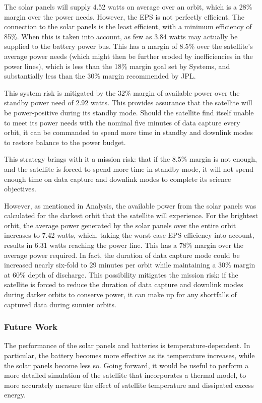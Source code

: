 \documentclass[12pt]{article}
\begin{document}
The solar panels will supply 4.52 watts on average over an orbit, which is a 28\% margin over the power needs.  However, the EPS is not perfectly efficient.  The connection to the solar panels is the least efficient, with a minimum efficiency of 85\%\cite[p.~9]{EPS-manual}.  When this is taken into account, as few as 3.84 watts may actually be supplied to the battery power bus.  This has a margin of 8.5\% over the satellite's average power needs (which might then be further eroded by inefficiencies in the power lines), which is less than the 18\% margin goal set by Systems, and substantially less than the 30\% margin recommended by JPL.

This system risk is mitigated by the 32\% margin of available power over the standby power need of 2.92 watts.  This provides assurance that the satellite will be power-positive during its standby mode.  Should the satellite find itself unable to meet its power needs with the nominal five minutes of data capture every orbit, it can be commanded to spend more time in standby and downlink modes to restore balance to the power budget.

This strategy brings with it a mission risk: that if the 8.5\% margin is not enough, and the satellite is forced to spend more time in standby mode, it will not spend enough time on data capture and downlink modes to complete its science objectives.

However, as mentioned in Analysis, the available power from the solar panels was calculated for the darkest orbit that the satellite will experience.  For the brightest orbit, the average power generated by the solar panels over the entire orbit increases to 7.42 watts, which, taking the worst-case EPS efficiency into account, results in 6.31 watts reaching the power line.  This has a 78\% margin over the average power required.  In fact, the duration of data capture mode could be increased nearly six-fold to 29 minutes per orbit while maintaining a 30\% margin at 60\% depth of discharge.  This possibility mitigates the mission risk: if the satellite is forced to reduce the duration of data capture and downlink modes during darker orbits to conserve power, it can make up for any shortfalls of captured data during sunnier orbits.

			\subsubsection{Future Work}
The performance of the solar panels and batteries is temperature-dependent.  In particular, the battery becomes more effective as its temperature increases, while the solar panels become less so.  Going forward, it would be useful to perform a more detailed simulation of the satellite that incorporates a thermal model, to more accurately measure the effect of satellite temperature and dissipated excess energy.
\end{document}
